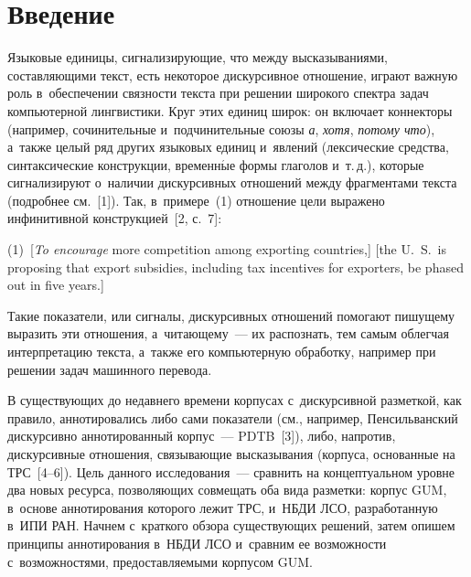 
  
\vspace*{-2pt}



\thispagestyle{headings}

\begin{multicols}{2}

\label{st\stat}
  
\section{Введение}

\vspace*{-1pt}

    Языковые единицы, сигнализирующие, что между высказываниями, 
составляющими текст, есть некоторое дискурсивное отношение, играют важную 
роль в~обеспечении связности текс\-та при решении широкого спектра задач 
компьютерной лингвистики. Круг этих единиц широк: он включает коннекторы 
(например, сочинительные и~подчинительные союзы \textit{а}, \textit{хотя}, 
\textit{потому что}), а~также целый ряд других языковых единиц и~явлений 
(лексические средства, синтаксические конструкции, временн$\acute{\mbox{ы}}$е формы глаголов и~т.\,д.), 
которые сигнализируют о~наличии дискурсивных отношений между 
фрагментами текста (подробнее см.~[1]). Так, в~примере~(1) отношение цели 
выражено инфинитивной конструкцией~[2, с.~7]:


\noindent
(1)~[\textit{To encourage} more competition among exporting countries,] [the U.\ S.\ is 
proposing that export subsidies, including tax incentives for exporters, be phased out in 
five years.] 

\smallskip
    
Такие показатели, или сигналы, дискурсивных отношений помогают пишущему 
выразить эти отношения, а~чи\-та\-юще\-му~--- их распознать, тем самым об\-лег\-чая 
интерпретацию текста, а~так\-же его компьютерную обработку, например при 
решении задач машинного перевода. 

    В существующих до недавнего времени корпусах с~дискурсивной разметкой, 
как правило, аннотировались либо сами показатели (см., например,\linebreak 
Пенсильванский дискурсивно аннотированный корпус~--- PDTB~[3]), либо, 
напротив, дискурсивные отношения, свя\-зы\-ва\-ющие высказывания (корпуса, 
основанные на ТРС~[4--6]). Цель данного 
исследования~--- сравнить на концептуальном уров\-не два новых ресурса, 
поз\-во\-ля\-ющих совмещать оба вида разметки: корпус GUM, в~основе 
аннотирования которого лежит ТРС, и~НБДИ ЛСО, разработанную 
в~ИПИ РАН. Начнем с~краткого обзора существующих решений, затем опишем 
принципы аннотирования в~НБДИ ЛСО и~сравним ее возможности 
с~возможностями, пред\-остав\-ля\-емы\-ми корпусом GUM.


\end{multicols}
